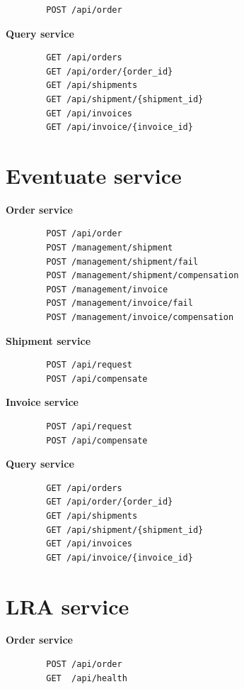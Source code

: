 \documentclass[oneside,
  digital, %
  table,   %
  nolof,     %
  nolot,     %
]{fithesis3}
\begin{document}
\begin{verbatim}
        POST /api/order
\end{verbatim}

\noindent
\textbf{Query service}

\begin{verbatim}
        GET /api/orders
        GET /api/order/{order_id}
        GET /api/shipments
        GET /api/shipment/{shipment_id}
        GET /api/invoices
        GET /api/invoice/{invoice_id}
\end{verbatim}

\section{Eventuate service}

\textbf{Order service}

\begin{verbatim}
        POST /api/order
        POST /management/shipment
        POST /management/shipment/fail
        POST /management/shipment/compensation
        POST /management/invoice
        POST /management/invoice/fail
        POST /management/invoice/compensation
\end{verbatim}

\noindent
\textbf{Shipment service}

\begin{verbatim}
        POST /api/request
        POST /api/compensate
\end{verbatim}

\noindent
\textbf{Invoice service}

\begin{verbatim}
        POST /api/request
        POST /api/compensate
\end{verbatim}

\noindent
\textbf{Query service}

\begin{verbatim}
        GET /api/orders
        GET /api/order/{order_id}
        GET /api/shipments
        GET /api/shipment/{shipment_id}
        GET /api/invoices
        GET /api/invoice/{invoice_id}
\end{verbatim}

\section{LRA service}

\textbf{Order service}

\begin{verbatim}
        POST /api/order
        GET  /api/health
\end{verbatim}
\end{document}
